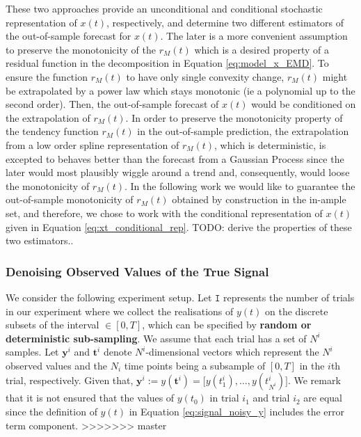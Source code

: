 These two approaches provide an unconditional and conditional stochastic representation of $x(t)$, respectively, and determine two different estimators of the out-of-sample forecast for $x(t)$.  The later is a more convenient assumption to preserve the monotonicity of the $r_M(t)$ which is a desired property of a residual function in the decomposition in Equation \eqref{eq:model_x_EMD}.  To ensure the function $r_M(t)$ to have only single convexity change, $r_M(t)$ might be extrapolated by a power law which stays monotonic (ie a polynomial up to the second order). Then, the out-of-sample forecast of $x(t)$ would be conditioned on the extrapolation of $r_M(t)$.  In order to preserve the monotonicity property of the tendency function $r_M(t)$ in the out-of-sample prediction, the extrapolation from a low order spline representation of $r_M(t)$, which is deterministic,  is excepted to behaves better than the forecast from a Gaussian Process since the later would most plausibly wiggle around a trend and, consequently, would loose the monotonicity of $r_M(t)$.  In the following work we would like to guarantee the out-of-sample monotonicity of $r_M(t)$ obtained by construction in the in-ample set,  and therefore, we chose to work with the conditional representation of $x(t)$ given in Equation \eqref{eq:xt_conditional_rep}.  {\color{red} TODO: derive the properties of these two estimators.}.

\subsubsection{Denoising Observed Values of the True Signal}
We consider the following experiment setup. Let $\mathtt{I}$ represents the number of trials in our experiment where we collect the realisations of $y(t)$ on the discrete subsets of the interval $ \in [0,T]$, which can be specified by \textbf{random or deterministic sub-sampling}. We assume that each trial has a set of $N^i$ samples. Let  $\mathbf{y}^{i}$ and $\mathbf{t}^i$ denote $N^i$-dimensional vectors which represent the $N^i$ observed values and the $N_i$ time points being a subsample of $[0,T]$ in the $i$th trial, respectively. Given that, $\mathbf{y}^{i} := y(\mathbf{t}^i) = \big[y(t_1^i), \ldots, y(t_{N^i}^i) \big]$. We remark that it is not ensured that the values of $y(t_0)$ in trial $i_1$ and trial $i_2$ are equal since the definition of $y(t)$ in Equation \eqref{eq:signal_noisy_y} includes the error term component.
>>>>>>> master



